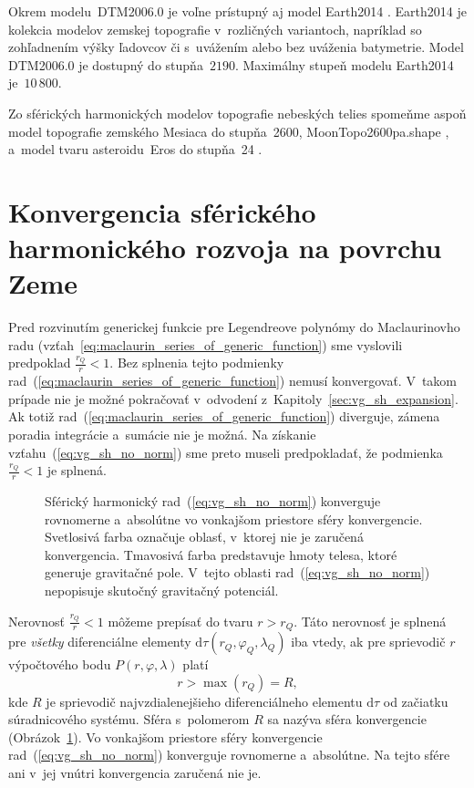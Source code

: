 \documentclass[a4paper, 12pt]{book}
\newcommand{\diff}{\mathrm d}
\begin{document}
Okrem modelu~DTM2006.0 je voľne prístupný aj model Earth2014 
\parencite{Hirt2015}.  Earth2014 je kolekcia modelov zemskej topografie 
v~rozličných variantoch, napríklad so zohľadnením výšky ľadovcov či s~uvážením 
alebo bez uváženia batymetrie.  Model DTM2006.0 je dostupný do stupňa~$2190$.  
Maximálny stupeň modelu Earth2014 je~$10\, 800$.

Zo sférických harmonických modelov topografie nebeských telies spomeňme aspoň 
model topografie zemského Mesiaca do stupňa~2600, MoonTopo2600pa.shape 
\parencite{Wieczorek2015}, a~model tvaru asteroidu~Eros do stupňa~24 
\parencite{Zuber2000}.






\section{Konvergencia sférického harmonického rozvoja na povrchu Zeme}
\label{sec:convergence_of_spherical_harmonics}

Pred rozvinutím generickej funkcie pre Legendreove polynómy do Maclaurinovho 
radu (vzťah~\ref{eq:maclaurin_series_of_generic_function}) sme vyslovili 
predpoklad $\frac{r_Q}{r} < 1$.  Bez splnenia tejto podmienky 
rad~(\ref{eq:maclaurin_series_of_generic_function}) nemusí konvergovať.  
V~takom prípade nie je možné pokračovať v~odvodení 
z~Kapitoly~\ref{sec:vg_sh_expansion}.  Ak totiž 
rad~(\ref{eq:maclaurin_series_of_generic_function}) diverguje, zámena poradia 
integrácie a~sumácie nie je možná.  Na získanie vzťahu~(\ref{eq:vg_sh_no_norm}) 
sme preto museli predpokladať, že podmienka $\frac{r_Q}{r} < 1$ je splnená.

\begin{figure}
\centering

\caption{Sférický harmonický rad~(\ref{eq:vg_sh_no_norm}) konverguje rovnomerne 
a~absolútne vo vonkajšom priestore sféry konvergencie.  Svetlosivá farba 
označuje oblasť, v~ktorej nie je zaručená konvergencia.  Tmavosivá farba 
predstavuje hmoty telesa, ktoré generuje gravitačné pole.  V~tejto oblasti 
rad~(\ref{eq:vg_sh_no_norm}) nepopisuje skutočný gravitačný potenciál.}
\label{fig:spherical_harmonics_convergence}
\end{figure}

Nerovnosť $\frac{r_Q}{r} < 1$ môžeme prepísať do tvaru $r > r_Q$.  Táto
nerovnosť je splnená pre \emph{všetky} diferenciálne elementy $\diff \tau(r_Q,
\varphi_Q, \lambda_Q)$ iba vtedy, ak pre sprievodič $r$ výpočtového bodu $P(r,
\varphi, \lambda)$ platí
%
\begin{equation}
\label{eq:spherical_harmonic_convergence}
r > \max(r_Q) = R{,}
\end{equation}
%
kde $R$ je sprievodič najvzdialenejšieho diferenciálneho elementu $\diff\tau$ 
od začiatku súradnicového systému.  Sféra s~polomerom $R$ sa nazýva sféra 
konvergencie \parencite{Hotine} 
(Obrázok~\ref{fig:spherical_harmonics_convergence}).  Vo vonkajšom priestore 
sféry konvergencie rad~(\ref{eq:vg_sh_no_norm}) konverguje rovnomerne 
a~absolútne.  Na tejto sfére ani v~jej vnútri konvergencia zaručená nie je.
\end{document}

